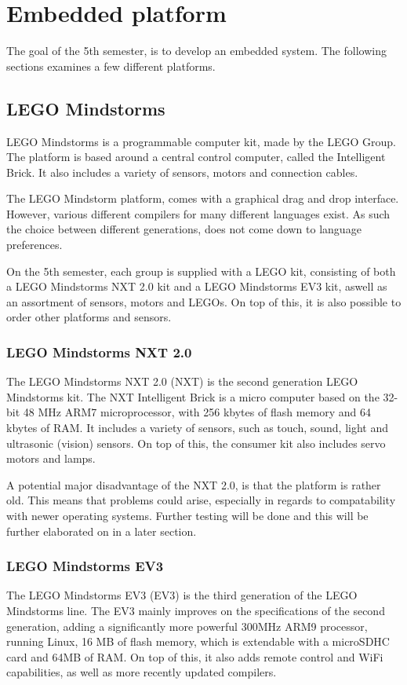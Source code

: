 \section{Embedded platform}
The goal of the 5th semester, is to develop an embedded system.
The following sections examines a few different platforms.

\subsection{LEGO Mindstorms}
LEGO Mindstorms is a programmable computer kit, made by the LEGO Group.
The platform is based around a central control computer, called the Intelligent Brick.
It also includes a variety of sensors, motors and connection cables.

The LEGO Mindstorm platform, comes with a graphical drag and drop interface.
However, various different compilers for many different languages exist.
As such the choice between different generations, does not come down to language preferences.

On the 5th semester, each group is supplied with a LEGO kit, consisting of both a LEGO Mindstorms NXT 2.0 kit and a LEGO Mindstorms EV3 kit, aswell as an assortment of sensors, motors and LEGOs.
On top of this, it is also possible to order other platforms and sensors.

\subsubsection{LEGO Mindstorms NXT 2.0}
The LEGO Mindstorms NXT 2.0 (NXT) is the second generation LEGO Mindstorms kit.
The NXT Intelligent Brick is a micro computer based on the 32-bit 48 MHz ARM7 microprocessor, with 256 kbytes of flash memory and 64 kbytes of RAM\cite{nxt2userguide}\cite{nxt2ev3compare}.
It includes a variety of sensors, such as touch, sound, light and ultrasonic (vision) sensors.
On top of this, the consumer kit also includes servo motors and lamps.

A potential major disadvantage of the NXT 2.0, is that the platform is rather old.
This means that problems could arise, especially in regards to compatability with newer operating systems.
Further testing will be done and this will be further elaborated on in a later section.

\subsubsection{LEGO Mindstorms EV3}
The  LEGO Mindstorms EV3 (EV3) is the third generation of the LEGO Mindstorms line.
The EV3 mainly improves on the specifications of the second generation, adding a significantly more powerful 300MHz ARM9 processor, running Linux, 16 MB of flash memory, which is extendable with a microSDHC card and 64MB of RAM\cite{ev3userguide}.
On top of this, it also adds remote control and WiFi capabilities, as well as more recently updated compilers.

